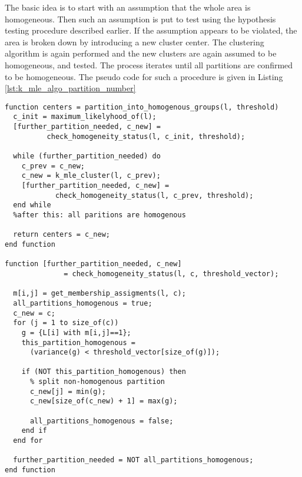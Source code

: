 The basic idea is to start with an assumption that the whole area is homogeneous.
Then such an assumption is put to test using the hypothesis testing procedure described earlier. 
If the assumption appears to be violated, the area is broken down by introducing a new cluster center. 
The clustering algorithm is again performed and the new clusters are again assumed to be homogeneous, and tested. 
The process iterates until all partitions are confirmed to be homogeneous. 
The pseudo code for such a procedure is given in Listing \ref{lst:k_mle_algo_partition_number}

\lstset{language=Matlab,caption=Homogenous partitions number growing,label=lst:k_mle_algo_partition_number}
\begin{lstlisting}[frame=tb]
function centers = partition_into_homogenous_groups(l, threshold)
  c_init = maximum_likelyhood_of(l);
  [further_partition_needed, c_new] = 
          check_homogeneity_status(l, c_init, threshold);

  while (further_partition_needed) do
    c_prev = c_new;
    c_new = k_mle_cluster(l, c_prev);
    [further_partition_needed, c_new] = 
            check_homogeneity_status(l, c_prev, threshold);    
  end while
  %after this: all paritions are homogenous

  return centers = c_new; 
end function

function [further_partition_needed, c_new] 
              = check_homogeneity_status(l, c, threshold_vector);    

  m[i,j] = get_membership_assigments(l, c);
  all_partitions_homogenous = true;
  c_new = c;
  for (j = 1 to size_of(c)) 
    g = {L[i] with m[i,j]==1};
    this_partition_homogenous = 
      (variance(g) < threshold_vector[size_of(g)]);

    if (NOT this_partition_homogenous) then
      % split non-homogenous partition
      c_new[j] = min(g);
      c_new[size_of(c_new) + 1] = max(g);

      all_partitions_homogenous = false;
    end if
  end for

  further_partition_needed = NOT all_partitions_homogenous;
end function
\end{lstlisting}

